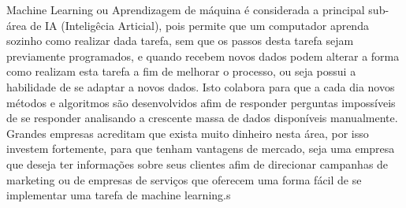 Machine Learning ou Aprendizagem de máquina é considerada a principal sub-área de IA (Inteligêcia Articial), pois permite
que um computador aprenda sozinho como realizar dada tarefa, sem que os passos desta tarefa sejam previamente programados, e
quando recebem novos dados podem alterar a forma como realizam esta tarefa a fim de melhorar o processo, ou seja possui a 
habilidade de se adaptar a novos dados.
Isto colabora para que a cada dia novos métodos e algoritmos são desenvolvidos afim de responder perguntas impossíveis de se responder
analisando a crescente massa de dados disponíveis manualmente. Grandes empresas acreditam que exista muito dinheiro nesta área,
por isso investem fortemente, para que tenham vantagens de mercado, seja uma empresa que deseja ter informações sobre
seus clientes afim de direcionar campanhas de marketing ou de empresas de serviços que oferecem uma forma fácil de se implementar
uma tarefa de machine learning.s
    


 

